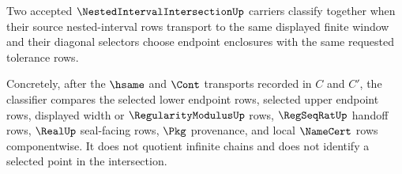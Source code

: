 \begin{definition}
\label{def:nested-interval-intersection-classifier}
Two accepted $\NestedIntervalIntersectionUp$ carriers classify together when their source nested-interval rows transport to the same displayed finite window and their diagonal selectors choose endpoint enclosures with the same requested tolerance rows.

Concretely, after the $\hsame$ and $\Cont$ transports recorded in $C$ and $C'$, the classifier compares the selected lower endpoint rows, selected upper endpoint rows, displayed width or $\RegularityModulusUp$ rows, $\RegSeqRatUp$ handoff rows, $\RealUp$ seal-facing rows, $\Pkg$ provenance, and local $\NameCert$ rows componentwise. It does not quotient infinite chains and does not identify a selected point in the intersection.
\end{definition}

